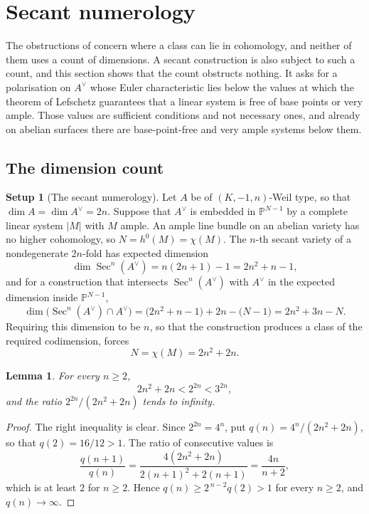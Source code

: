 \documentclass[11pt,reqno]{amsart}
\theoremstyle{plain}
\newtheorem{lemma}[theorem]{Lemma}
\theoremstyle{definition}
\newtheorem{setupenv}[theorem]{Setup}
\theoremstyle{remark}
\newcommand{\PP}{\mathbb{P}}
\newcommand{\Av}{A^{\vee}}
\DeclareMathOperator{\Sec}{Sec}
\begin{document}
\section{Secant numerology}\label{sec:numerology}

The obstructions of  concern where a class
can lie in cohomology, and neither of them uses a count of dimensions. A
secant construction is also subject to such a count, and this section shows
that the count obstructs nothing. It asks for a polarisation on $\Av$ whose
Euler characteristic lies below the values at which the theorem of Lefschetz
guarantees that a linear system is free of base points or very ample. Those
values are sufficient conditions and not necessary ones, and already on
abelian surfaces there are base-point-free and very ample systems below them.

\subsection{The dimension count}

\begin{setupenv}[The secant numerology]\label{setup:numerology}
Let $A$ be of $(K,-1,n)$-Weil type, so that $\dim A=\dim\Av=2n$. Suppose that
$\Av$ is embedded in $\PP^{N-1}$ by a complete linear system $|M|$ with $M$
ample. An ample line bundle on an abelian variety has no higher cohomology,
so $N=h^{0}(M)=\chi(M)$. The $n$-th secant variety of a nondegenerate
$2n$-fold has expected dimension
\[
  \dim\Sec^{n}(\Av)=n(2n+1)-1=2n^{2}+n-1,
\]
and for a construction that intersects $\Sec^{n}(\Av)$ with $\Av$ in the
expected dimension inside $\PP^{N-1}$,
\[
  \dim\bigl(\Sec^{n}(\Av)\cap\Av\bigr)
  =\bigl(2n^{2}+n-1\bigr)+2n-\bigl(N-1\bigr)
  =2n^{2}+3n-N .
\]
Requiring this dimension to be $n$, so that the construction produces a class
of the required codimension, forces
\begin{equation}\label{eq:chirequired}
  N=\chi(M)=2n^{2}+2n .
\end{equation}
\end{setupenv}

\begin{lemma}\label{lem:chicompare}
For every $n\ge2$,
\[
  2n^{2}+2n<2^{2n}<3^{2n},
\]
and the ratio $2^{2n}/(2n^{2}+2n)$ tends to infinity.
\end{lemma}

\begin{proof}
The right inequality is clear. Since $2^{2n}=4^{n}$, put
$q(n)=4^{n}/(2n^{2}+2n)$, so that $q(2)=16/12>1$. The ratio of consecutive
values is
\[
  \frac{q(n+1)}{q(n)}=\frac{4(2n^{2}+2n)}{2(n+1)^{2}+2(n+1)}=\frac{4n}{n+2},
\]
which is at least $2$ for $n\ge2$. Hence $q(n)\ge2^{\,n-2}q(2)>1$ for every
$n\ge2$, and $q(n)\to\infty$.
\end{proof}
\end{document}
